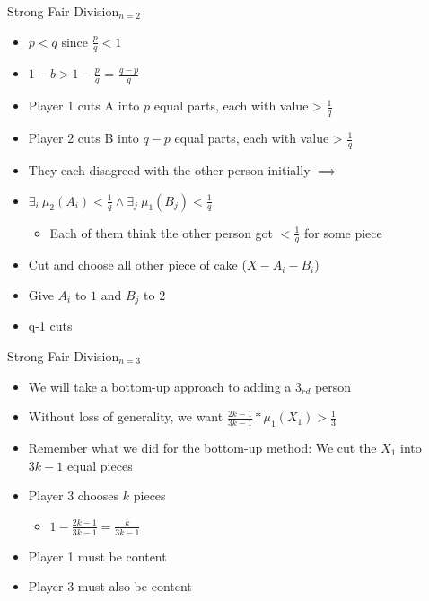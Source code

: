 \documentclass[aspectratio=169,xcolor=dvipsnames]{beamer}
\begin{document}
\begin{frame}{Strong Fair Division$ _{n=2}$}
	\begin{itemize}
		\item $ p < q $ since $ \frac{p}{q} < 1$
		\item $1-b > 1-\frac{p}{q}$ = $\frac{q-p}{q}$ \pause
		\item Player 1 cuts A into $p$ equal parts, each with value > $ \frac{1}{q}$
		\item Player 2 cuts B into $q-p$ equal parts, each with value >  $\frac{1}{q}$ \pause
		\item They each disagreed with the other person initially $ \implies $
		\item $ \exists_{i}~\mu_2(A_i) < \frac{1}{q} \wedge \exists_{j}~\mu_1(B_j) < \frac{1}{q}$ 
		\begin{itemize}
			\item Each of them think the other person got $ < \frac{1}{q}$ for some piece
		\end{itemize} \pause
		\item Cut and choose all other piece of cake ($ X - A_i - B_i $)
		\item Give $ A_i $ to $ 1 $ and $ B_j $ to $ 2 $ \pause
		\item q-1 cuts 
	\end{itemize}
\end{frame}
\begin{frame}{Strong Fair Division$ _{n=3}$}
	\begin{itemize}
		\item We will take a bottom-up approach to adding a $3_{rd}$ person
		\item Without loss of generality, we want $\frac{2k-1}{3k-1}\ast\mu_1(X_1) > \frac{1}{3}$ \pause
		\item Remember what we did for the bottom-up method: We cut the $X_1$ into $3k-1$ equal pieces
		\item Player 3 chooses $k$ pieces
		\begin{itemize}
			\item $ 1 - \frac{2k-1}{3k-1} = \frac{k}{3k-1}$
		\end{itemize}
		\item Player 1 must be content
		\item Player 3 must also be content
	\end{itemize}
\end{frame}
\end{document}
